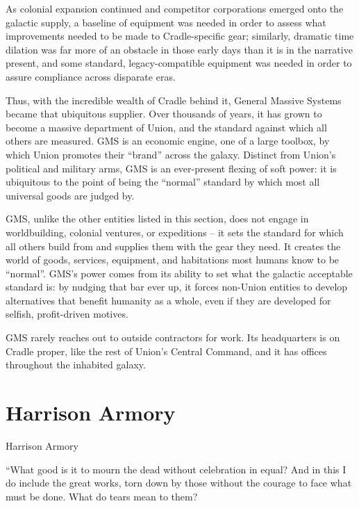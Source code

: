 As colonial expansion continued and competitor corporations emerged onto the galactic supply, a  
baseline of equipment was needed in order to assess what improvements needed to be made to  
Cradle-specific gear; similarly, dramatic time dilation was far more of an obstacle in those early  
days than it is in the narrative present, and some standard, legacy-compatible equipment was  
needed in order to assure compliance across disparate eras.   

                                                                                                                


Thus, with the incredible wealth of Cradle behind it, General Massive Systems became that  
ubiquitous supplier. Over thousands of years, it has grown to become a massive department of  
Union, and the standard against which all others are measured. GMS is an economic engine, one  
of a large toolbox, by which Union promotes their “brand” across the galaxy. Distinct from Union’s  
political and military arms, GMS is an ever-present flexing of soft power: it is ubiquitous to the  
point of being the “normal” standard by which most all universal goods are judged by.   

GMS, unlike the other entities listed in this section, does not engage in worldbuilding, colonial  
ventures, or expeditions -- it sets the standard for which all others build from and supplies them  
with the gear they need. It creates the world of goods, services, equipment, and habitations most  
humans know to be “normal”. GMS’s power comes from its ability to set what the galactic  
acceptable standard is: by nudging that bar ever up, it forces non-Union entities to develop  
alternatives that benefit humanity as a whole, even if they are developed for selfish, profit-driven  
motives.   

GMS rarely reaches out to outside contractors for work. Its headquarters is on Cradle proper, like  
the rest of Union’s Central Command, and it has offices throughout the inhabited galaxy.  
\section{Harrison Armory}
Harrison Armory  

         “What good is it to mourn the dead without celebration in equal? And in this I do include the  
         great works, torn down by those without the courage to face what must be done. What do  
         tears mean to them?  

